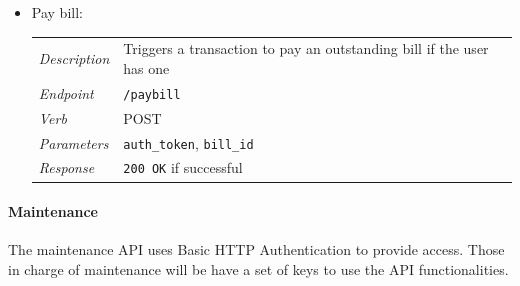 \documentclass[english]{article}
\newcommand{\code}[1]{\texttt{#1}}
\begin{document}
\begin{itemize}
	\item{Pay bill:}\\
	\begin{tabular}{ | l l }
		\textit{Description} & Triggers a transaction to pay an outstanding bill if the user has one\\
		\textit{Endpoint} & \code{/paybill} \\ 
		\textit{Verb} & POST \\  
		\textit{Parameters} & \code{auth\_token}, \code{bill\_id}  \\
		\textit{Response} & \code{200 OK} if successful
	\end{tabular}

\end{itemize}


\paragraph{Maintenance}
The maintenance API uses Basic HTTP Authentication to provide access. Those in charge of maintenance will be have a set of keys to use the API functionalities.
\end{document}
